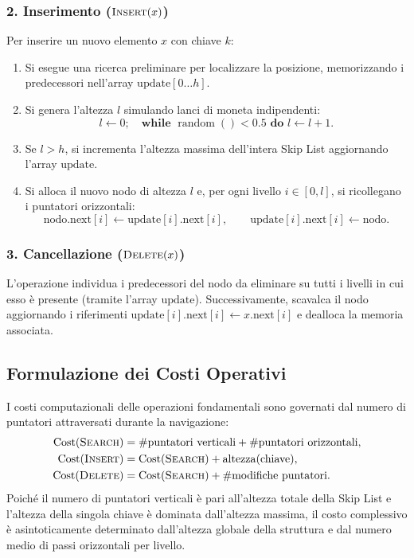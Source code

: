 \subsubsection{2. Inserimento ($\textsc{Insert}(x)$)}
Per inserire un nuovo elemento $x$ con chiave $k$:
\begin{enumerate}
  \item Si esegue una ricerca preliminare per localizzare la posizione, memorizzando i predecessori nell'array $\text{update}[0 \dots h]$.
  \item Si genera l'altezza $l$ simulando lanci di moneta indipendenti:
  \begin{equation*}
    l \leftarrow 0; \quad \textbf{while } \operatorname{random}() < 0.5 \textbf{ do } l \leftarrow l + 1.
  \end{equation*}
  \item Se $l > h$, si incrementa l'altezza massima dell'intera Skip List aggiornando l'array $\text{update}$.
  \item Si alloca il nuovo nodo di altezza $l$ e, per ogni livello $i \in [0, l]$, si ricollegano i puntatori orizzontali:
  \begin{equation}
    \text{nodo}.\text{next}[i] \leftarrow \text{update}[i].\text{next}[i], \qquad \text{update}[i].\text{next}[i] \leftarrow \text{nodo}.
  \end{equation}
\end{enumerate}

\subsubsection{3. Cancellazione ($\textsc{Delete}(x)$)}
L'operazione individua i predecessori del nodo da eliminare su tutti i livelli in cui esso è presente (tramite l'array $\text{update}$). Successivamente, scavalca il nodo aggiornando i riferimenti $\text{update}[i].\text{next}[i] \leftarrow x.\text{next}[i]$ e dealloca la memoria associata.

\FloatBarrier
\subsection{Formulazione dei Costi Operativi}
I costi computazionali delle operazioni fondamentali sono governati dal numero di puntatori attraversati durante la navigazione:
\begin{align}
  \operatorname{Cost}(\textsc{Search}) &= \# \text{puntatori verticali} + \# \text{puntatori orizzontali}, \label{eq:cost-search} \\
  \operatorname{Cost}(\textsc{Insert}) &= \operatorname{Cost}(\textsc{Search}) + \operatorname{altezza}(\text{chiave}), \label{eq:cost-insert} \\
  \operatorname{Cost}(\textsc{Delete}) &= \operatorname{Cost}(\textsc{Search}) + \# \text{modifiche puntatori}. \label{eq:cost-delete}
\end{align}
Poiché il numero di puntatori verticali è pari all'altezza totale della Skip List e l'altezza della singola chiave è dominata dall'altezza massima, il costo complessivo è asintoticamente determinato dall'altezza globale della struttura e dal numero medio di passi orizzontali per livello.

